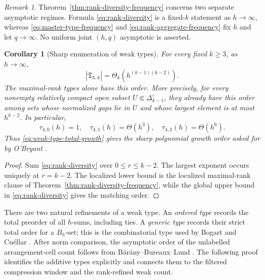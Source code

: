 \documentclass[11pt,reqno]{amsart}
\newtheorem{corollary}[theorem]{Corollary}
\theoremstyle{definition}
\theoremstyle{remark}
\newtheorem{remark}[theorem]{Remark}
\begin{document}
\begin{remark}\label{rem:rank-duality-scope}
Theorem~\ref{thm:rank-diversity-frequency} concerns two separate asymptotic
regimes.  Formula \eqref{eq:rank-diversity} is a fixed-$k$ statement as
$h\to\infty$, whereas \eqref{eq:master-type-frequency} and
\eqref{eq:rank-aggregate-frequency} fix $h$ and let $q\to\infty$. No
uniform joint $(h,q)$ asymptotic is asserted.
\end{remark}

\begin{corollary}[Sharp enumeration of weak types]
\label{cor:weak-type-diversity}
For every fixed $k\geq3$, as $h\to\infty$,
\begin{equation}\label{eq:weak-type-total-growth}
 |\mathfrak T_{h,k}|
 =\Theta_k\!\left(h^{(k-1)(k-2)}\right).
\end{equation}
The maximal-rank types alone have this order.  More precisely, for every
nonempty relatively compact open subset
$U\Subset\Delta_{k-1}^{\circ}$, they already have this order among sets
whose normalized gaps lie in $U$ and whose largest element is at most
$h^{k-2}$.  In particular,
\[
 \tau_{4,0}(h)=1,\quad
 \tau_{4,1}(h)=\Theta(h^3),\quad
 \tau_{4,2}(h)=\Theta(h^6).
\]
Thus \eqref{eq:weak-type-total-growth} gives the sharp polynomial growth
order asked for by O'Bryant \cite[Question~6]{OBryant2025}.
\end{corollary}

\begin{proof}
Sum \eqref{eq:rank-diversity} over $0\leq r\leq k-2$. The largest
exponent occurs uniquely at $r=k-2$.  The localized lower bound is the
localized maximal-rank clause of
Theorem~\ref{thm:rank-diversity-frequency}, while the global upper bound in
\eqref{eq:rank-diversity} gives the matching order.
\end{proof}

There are two natural refinements of a weak type. An \emph{ordered type}
records the total preorder of all $h$-sums, including ties. A
\emph{generic type} records their strict total order for a $B_h$-set; this
is the combinatorial type used by Bogart and Cu\'ellar
\cite[Definition~2.4 and Theorem~2.5]{BogartCuellar2025}.
After norm comparison, the asymptotic order of the unlabelled
arrangement-cell count follows from B\'ar\'any--Bureaux--Lund
\cite[Theorem~5.6]{BaranyBureauxLund2018}.  The following proof identifies
the additive types explicitly and connects them to the filtered compression
window and the rank-refined weak count.
\end{document}
